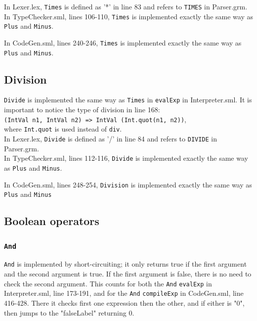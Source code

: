 \documentclass[11pt,a4paper]{article}
\theoremstyle{plain}
\theoremstyle{definition}
\theoremstyle{remark}
\numberwithin{equation}{section}
\begin{document}
	In Lexer.lex, \texttt{Times} is defined as '*' in line 83 and refers to \texttt{TIMES} in Parser.grm.\\
	
	In TypeChecker.sml, lines 106-110, \texttt{Times} is implemented exactly the same way as \texttt{Plus} and \texttt{Minus}.
	
	In CodeGen.sml, lines 240-246,  \texttt{Times} is implemented exactly the same way as \texttt{Plus} and \texttt{Minus}.
	
	
	\subsection{Division}
	\texttt{Divide} is implemented the same way as \texttt{Times} in \texttt{evalExp} in Interpreter.sml. It is important to notice the type of division in line 168:\\
	\texttt{(IntVal n1, IntVal n2) => IntVal (Int.quot(n1, n2))},\\
	where \texttt{Int.quot} is used instead of \texttt{div}.\\
	
	In Lexer.lex, \texttt{Divide} is defined as '/' in line 84 and refers to \texttt{DIVIDE} in Parser.grm.\\
	
	In TypeChecker.sml, lines 112-116, \texttt{Divide} is implemented exactly the same way as \texttt{Plus} and \texttt{Minus}.
	
	In CodeGen.sml, lines 248-254,  \texttt{Division} is implemented exactly the same way as \texttt{Plus} and \texttt{Minus}
	
	\subsection{Boolean operators}
	\subsubsection{\texttt{And}}
	\texttt{And} is implemented by short-circuiting; it only returns true if the first argument and the second argument is true. If the first argument is false, there is no need to check the second argument. This counts for both the \texttt{And} \texttt{evalExp} in Interpreter.sml, line 173-191, and for the \texttt{And} \texttt{compileExp} in CodeGen.sml, line 416-428. There it checks first one expression then the other, and if either is "0", then jumps to the "falseLabel" returning 0.
	
\end{document}
